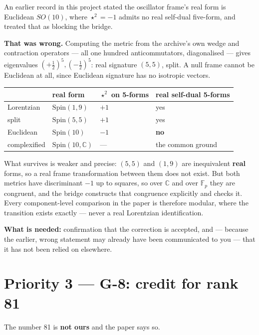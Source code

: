 \documentclass[11pt,a4paper]{article}
\begin{document}
An earlier record in this project stated the oscillator frame's real form is
Euclidean $SO(10)$, where $\star^2 = -1$ admits no real self-dual five-form, and
treated that as blocking the bridge.

\textbf{That was wrong.} Computing the metric from the archive's own wedge and
contraction operators --- all one hundred anticommutators, diagonalised --- gives
eigenvalues $(+\tfrac12)^5, (-\tfrac12)^5$: real signature $(5,5)$, split. A null
frame cannot be Euclidean at all, since Euclidean signature has no isotropic
vectors.

\begin{center}
\begin{tabular}{llll}
\toprule
 & real form & $\star^2$ on 5-forms & real self-dual 5-forms \\
\midrule
Lorentzian   & $\mathrm{Spin}(1,9)$            & $+1$ & yes \\
split        & $\mathrm{Spin}(5,5)$            & $+1$ & yes \\
Euclidean    & $\mathrm{Spin}(10)$             & $-1$ & \textbf{no} \\
complexified & $\mathrm{Spin}(10,\mathbb{C})$  & ---  & the common ground \\
\bottomrule
\end{tabular}
\end{center}

What survives is weaker and precise: $(5,5)$ and $(1,9)$ are inequivalent
\textbf{real} forms, so a real frame transformation between them does not exist.
But both metrics have discriminant $-1$ up to squares, so over $\mathbb{C}$ and
over $\mathbb{F}_p$ they are congruent, and the bridge constructs that congruence
explicitly and checks it. Every component-level comparison in the paper is
therefore modular, where the transition exists exactly --- never a real Lorentzian
identification.

\textbf{What is needed:} confirmation that the correction is accepted, and ---
because the earlier, wrong statement may already have been communicated to you ---
that it has not been relied on elsewhere.

\section*{Priority 3 --- G-8: credit for rank 81}

The number 81 is \textbf{not ours} and the paper says so.
\end{document}
